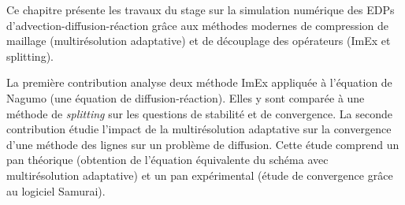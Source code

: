 Ce chapitre présente les travaux du stage sur la simulation numérique des EDPs d'advection-diffusion-réaction grâce
aux méthodes modernes de compression de maillage (multirésolution adaptative) et de découplage des opérateurs (ImEx et splitting).\par
La première contribution analyse deux méthode ImEx appliquée à l'équation de Nagumo (une équation de diffusion-réaction).
Elles y sont comparée à une méthode de \textit{splitting} sur les questions de stabilité et de convergence.
La seconde contribution étudie l'impact de la multirésolution adaptative sur la convergence d'une méthode des lignes sur un problème de diffusion.
Cette étude comprend un pan théorique (obtention de l'équation équivalente du schéma avec multirésolution adaptative) et un pan expérimental (étude de convergence grâce au logiciel Samurai).